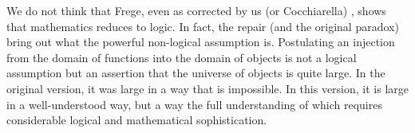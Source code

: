 \documentclass[12pt]{article}
\begin{document}
We do not think that Frege, even as corrected by us (or Cocchiarella) , shows that mathematics reduces to logic.  In fact, the repair (and the original paradox) bring out what the powerful non-logical assumption is.  Postulating an injection from the domain of  functions into the domain of objects  is not a logical assumption but an assertion that the universe of objects is quite large.  In the original version, it was large in a way that is impossible.  In this version, it is large in a well-understood way, but a way the full understanding of which requires considerable logical and mathematical sophistication.
\end{document}
